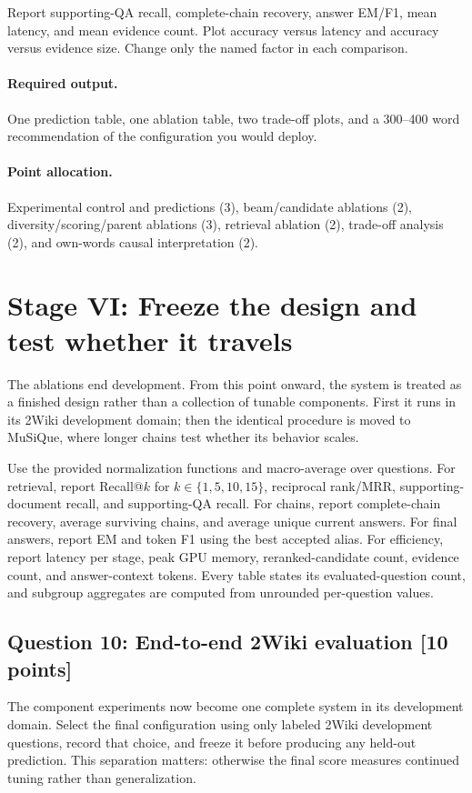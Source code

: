 \documentclass[11pt]{article}
\newcommand{\question}[3]{%
  \subsection[Question #1: #2 (#3 points)]{Question #1: #2 \hfill [#3 points]}%
}
\newcommand{\deliverables}{\paragraph{Required output.}}
\newcommand{\grading}{\paragraph{Point allocation.}}
\begin{document}
Report supporting-QA recall, complete-chain recovery, answer EM/F1, mean
latency, and mean evidence count. Plot accuracy versus latency and accuracy
versus evidence size. Change only the named factor in each comparison.

\deliverables One prediction table, one ablation table, two trade-off plots,
and a 300--400 word recommendation of the configuration you would deploy.

\grading Experimental control and predictions (3), beam/candidate ablations
(2), diversity/scoring/parent ablations (3), retrieval ablation (2), trade-off
analysis (2), and own-words causal interpretation (2).

\section{Stage VI: Freeze the design and test whether it travels}

The ablations end development. From this point onward, the system is treated
as a finished design rather than a collection of tunable components. First it
runs in its 2Wiki development domain; then the identical procedure is moved to
MuSiQue, where longer chains test whether its behavior scales.

Use the provided normalization functions and macro-average over questions.
For retrieval, report Recall@$k$ for $k\in\{1,5,10,15\}$, reciprocal
rank/MRR, supporting-document recall, and supporting-QA recall. For chains,
report complete-chain recovery, average surviving chains, and average unique
current answers. For final answers, report EM and token F1 using the best
accepted alias. For efficiency, report latency per stage, peak GPU memory,
reranked-candidate count, evidence count, and answer-context tokens. Every
table states its evaluated-question count, and subgroup aggregates are
computed from unrounded per-question values.

\question{10}{End-to-end 2Wiki evaluation}{10}

The component experiments now become one complete system in its development
domain. Select the final configuration using only labeled 2Wiki development
questions, record that choice, and freeze it before producing any held-out
prediction. This separation matters: otherwise the final score measures
continued tuning rather than generalization.
\end{document}
